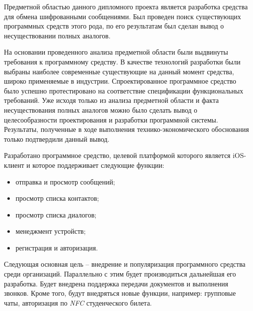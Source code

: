 
Предметной областью данного дипломного проекта является разработка средства для обмена шифрованными сообщениями. Был проведен поиск существующих программных средств этого рода, по его результатам был сделан вывод о несуществовании полных аналогов.

На основании проведенного анализа предметной области были выдвинуты требования к программному средству. В качестве технологий разработки были выбраны наиболее современные существующие на данный момент средства, широко применяемые в индустрии. Спроектированное программное средство было успешно протестировано на соответствие спецификации функциональных требований. Уже исходя только из анализа предметной области и факта несуществования полных аналогов можно было сделать вывод о целесообразности проектирования и разработки программной системы. Результаты, полученные в ходе выполнения технико-экономического обоснования только подтвердили данный вывод.

Разработано программное средство, целевой платформой которого является iOS-клиент и которое поддерживает следующие функции:
\begin{itemize}
	\item отправка и просмотр сообщений;
	\item просмотр списка контактов;
	\item просмотр списка диалогов;
	\item менеджмент устройств;
	\item регистрация и авторизация.
\end{itemize}

Следующая основная цель -- внедрение и популяризация программного средства среди организаций. Параллельно с этим будет производиться дальнейшая его разработка. Будет внедрена поддержка передачи документов и выполнения звонков. Кроме того, будут внедряться новые функции, например: групповые чаты, авторизация по \textit{NFC} студенческого билета.